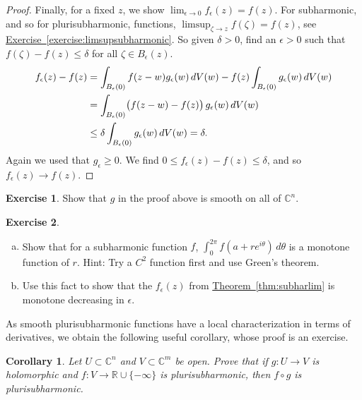 \documentclass[12pt,openany]{book}
\newcommand{\avoidbreak}{\postdisplaypenalty=100}
\newcommand{\C}{{\mathbb{C}}}
\newcommand{\R}{{\mathbb{R}}}
\theoremstyle{plain}
\newtheorem{cor}[thm]{Corollary}
\theoremstyle{remark}
\theoremstyle{definition}
\newenvironment{exbox}{%
    \def\FrameCommand{\vrule width 1pt \relax\hspace{10pt}}%
    \MakeFramed{\advance\hsize-\width\FrameRestore}%
}{%
    \endMakeFramed
}
\newenvironment{exparts}{%
    \leavevmode\begin{enumerate}[a),noitemsep,topsep=0pt,parsep=0pt,partopsep=0pt]
}{%
    \end{enumerate}
}
\theoremstyle{exercise}
\newtheorem{exercise}{Exercise}[section]
\theoremstyle{example}
\newcommand{\exerciseref}[1]{\hyperref[#1]{Exercise~\ref*{#1}}}
\newcommand{\thmref}[1]{\hyperref[#1]{Theorem~\ref*{#1}}}
\begin{document}
\begin{proof}
Finally, for a fixed $z$, we show $\lim_{\epsilon \to 0} f_\epsilon (z) = f(z)$.
For subharmonic, and so for plurisubharmonic,
functions, $\limsup_{\zeta\to z} f(\zeta) = f(z)$,
see \exerciseref{exercise:limsupsubharmonic}.
So given $\delta >0$, find an $\epsilon >0$ such that
$f(\zeta)-f(z) \leq \delta$ for all $\zeta \in B_\epsilon(z)$.
\begin{equation*}
\begin{split}
f_\epsilon(z) - f(z)
& =
\int_{B_\epsilon(0)} f(z-w) g_\epsilon (w)
\, dV(w)
- f(z)
\int_{B_\epsilon(0)} g_\epsilon (w)
\, dV(w)
\\
& =
\int_{B_\epsilon(0)} \bigl(f(z-w)-f(z)\bigr)\, g_\epsilon (w)
\, dV(w)
\\
& \leq
\delta
\int_{B_\epsilon(0)} g_\epsilon (w)
\, dV(w)
= \delta .
\avoidbreak
\end{split}
\end{equation*}
Again we used that $g_\epsilon \geq 0$.
We find $0 \leq f_\epsilon(z) - f(z) \leq \delta$, and so $f_\epsilon(z) \to
f(z)$.
\end{proof}

\begin{exbox}
\begin{exercise}
Show that $g$ in the proof above is smooth on all of $\C^n$.
\end{exercise}

\begin{exercise}
\begin{exparts}
\item
Show that for a subharmonic function $f$, $\int_0^{2\pi} f(a+re^{i\theta}) \,
d\theta$ is a monotone function of $r$.
Hint: Try a $C^2$ function first and use Green's theorem.
\item
Use this
fact to show that the $f_\epsilon(z)$ from \thmref{thm:subharlim} is monotone
decreasing in $\epsilon$.
\end{exparts}
\end{exercise}
\end{exbox}

As smooth plurisubharmonic functions have a
local characterization in terms of derivatives,
we obtain the following useful corollary,
whose proof is an exercise.

\begin{cor} \label{cor:pshcompose}
Let $U \subset \C^n$
and $V \subset \C^m$ be open.
Prove that
if $g \colon U \to V$ is holomorphic and
$f \colon V \to \R \cup \{ - \infty \}$ is plurisubharmonic,
then $f \circ g$ is plurisubharmonic.
\end{cor}
\end{document}
